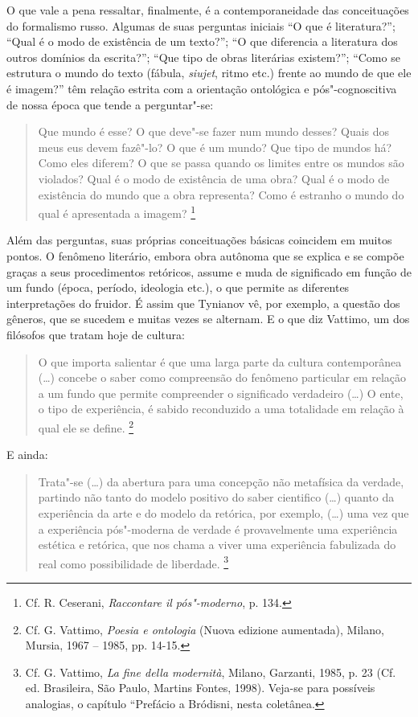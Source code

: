 O que vale a pena ressaltar, finalmente, é a contemporaneidade das
conceituações do formalismo russo. Algumas de suas perguntas iniciais
``O que é literatura?''; ``Qual é o modo de existência de um texto?'';
``O que diferencia a literatura dos outros domínios da escrita?''; ``Que
tipo de obras literárias existem?''; ``Como se estrutura o mundo do
texto (fábula, \emph{siujet}, ritmo etc.) frente ao mundo de que ele é
imagem?'' têm relação estrita com a orientação ontológica e
pós"-cognoscitiva de nossa época que tende a perguntar"-se:

\begin{quote}
Que mundo é esse? O que deve"-se fazer num mundo desses? Quais dos meus
eus devem fazê"-lo? O que é um mundo? Que tipo de mundos há? Como eles
diferem? O que se passa quando os limites entre os mundos são violados?
Qual é o modo de existência de uma obra? Qual é o modo de existência do
mundo que a obra representa? Como é estranho o mundo do qual é
apresentada a imagem? \footnote{Cf. R. Ceserani, \emph{Raccontare il
  pós"-moderno}, p. 134.}
\end{quote}

Além das perguntas, suas próprias conceituações básicas coincidem em
muitos pontos. O fenômeno literário, embora obra autônoma que se explica
e se compõe graças a seus procedimentos retóricos, assume e muda de
significado em função de um fundo (época, período, ideologia etc.), o
que permite as diferentes interpretações do fruidor. É assim que
Tynianov vê, por exemplo, a questão dos gêneros, que se sucedem e muitas
vezes se alternam. E o que diz Vattimo, um dos filósofos que tratam hoje
de cultura:

\begin{quote}
O que importa salientar é que uma larga parte da cultura contemporânea
(\ldots{}) concebe o saber como compreensão do fenômeno particular em
relação a um fundo que permite compreender o significado verdadeiro
(\ldots{}) O ente, o tipo de experiência, é sabido reconduzido a uma
totalidade em relação à qual ele se define. \footnote{Cf. G. Vattimo,
  \emph{Poesia e ontologia} (Nuova edizione aumentada), Milano, Mursia,
  1967 -- 1985, pp. 14-15.}
\end{quote}

E ainda:

\begin{quote}
Trata"-se (\ldots{}) da abertura para uma concepção não metafísica da
verdade, partindo não tanto do modelo positivo do saber cientifico
(\ldots{}) quanto da experiência da arte e do modelo da retórica, por
exemplo, (\ldots{}) uma vez que a experiência pós"-moderna de verdade é
provavelmente uma experiência estética e retórica, que nos chama a viver
uma experiência fabulizada do real como possibilidade de liberdade.
\footnote{Cf. G. Vattimo, \emph{La fine della modernità}, Milano,
  Garzanti, 1985, p. 23 (Cf. ed. Brasileira, São Paulo, Martins Fontes,
  1998). Veja-se para possíveis analogias, o capítulo ``Prefácio a
  Bródisni, nesta coletânea.}
\end{quote}

